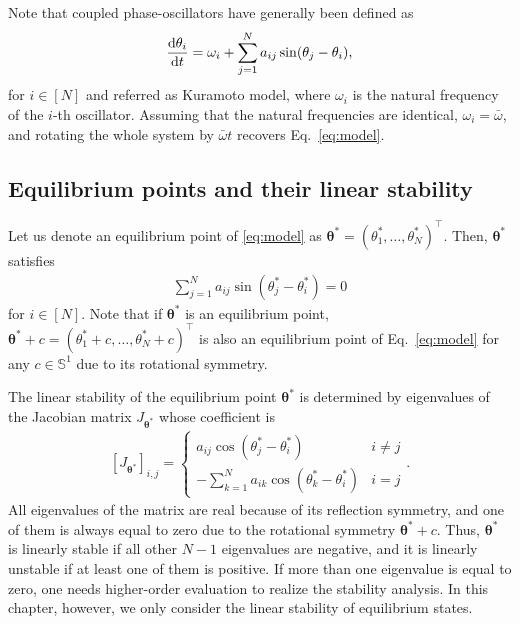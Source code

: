 Note that coupled phase-oscillators have generally been defined as
\begin{align}
    \frac{\mathrm{d}\theta_{i}}{\mathrm{d} t} = \omega_{i} + \sum_{j=1}^{N}a_{ij}\sin(\theta_{j}-\theta_{i}),
\end{align}
for $i\in[N]$ and referred as Kuramoto model, where $\omega_{i}$ is the natural frequency of the $i$-th oscillator\cite{kuramoto1975}. Assuming that the natural frequencies are identical, $\omega_{i}=\bar{\omega}$, and rotating the whole system by $\bar{\omega}t$ recovers Eq.~\eqref{eq:model}.

\subsection{Equilibrium points and their linear stability}

Let us denote an equilibrium point of \eqref{eq:model} as $\bm{\theta}^{\ast} = (\theta_{1}^{\ast},\dots,\theta_{N}^{\ast})^{\top}$. Then, $\bm{\theta}^{\ast}$ satisfies
\begin{align}
    \sum_{j=1}^{N}a_{ij}\sin(\theta_{j}^{\ast}-\theta_{i}^{\ast})=0
\end{align}
for $i\in[N]$. Note that if $\bm{\theta}^{\ast}$ is an equilibrium point, $\bm{\theta}^{\ast}+c= (\theta_{1}^{\ast}+c,\dots,\theta_{N}^{\ast}+c)^{\top}$ is also an equilibrium point of Eq.~\eqref{eq:model} for any $c\in\mathbb{S}^{1}$ due to its rotational symmetry.

The linear stability of the equilibrium point $\bm{\theta}^{\ast}$ is determined by eigenvalues of the Jacobian matrix $J_{\bm{\theta}^{\ast}}$ whose coefficient is
\begin{align}
    \left[J_{\bm{\theta}^{\ast}}\right]_{i,j} = \left\{
    \begin{array}{ll}
        a_{ij}\cos(\theta_{j}^{\ast}-\theta_{i}^{\ast}) & i\ne j \\
        -\displaystyle\sum_{k=1}^{N}a_{ik}\cos(\theta_{k}^{\ast}-\theta_{i}^{\ast}) & i = j
    \end{array}
    \right. .
    \label{eq:jacobian}
\end{align}
All eigenvalues of the matrix are real because of its reflection symmetry, and one of them is always equal to zero due to the rotational symmetry $\bm{\theta}^{\ast}+c$. Thus, $\bm{\theta}^{\ast}$ is linearly stable if all other $N-1$ eigenvalues are negative, and it is linearly unstable if at least one of them is positive. If more than one eigenvalue is equal to zero, one needs higher-order evaluation to realize the stability analysis. In this chapter, however, we only consider the linear stability of equilibrium states.

